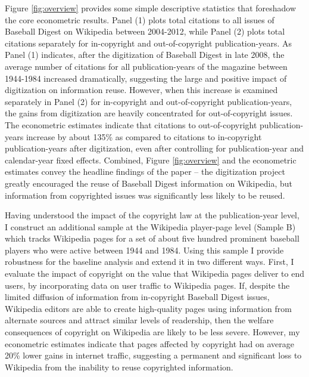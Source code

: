 \documentclass[11pt]{article}
\begin{document}
Figure \ref{fig:overview} provides some simple descriptive statistics that foreshadow the core econometric results. Panel (1) plots total citations to all issues of Baseball Digest on Wikipedia between 2004-2012, while Panel (2) plots total citations separately for in-copyright and out-of-copyright publication-years. As Panel (1) indicates, after the digitization of Baseball Digest in late 2008, the average number of citations for all publication-years of the magazine between 1944-1984 increased dramatically, suggesting the large and positive impact of digitization on information reuse. However, when this increase is examined separately in Panel (2) for in-copyright and out-of-copyright publication-years, the gains from digitization are heavily concentrated for out-of-copyright issues. The econometric estimates indicate that citations to out-of-copyright publication-years increase by about 135\% as compared to citations to in-copyright publication-years after digitization, even after controlling for publication-year and calendar-year fixed effects. Combined, Figure \ref{fig:overview} and the econometric estimates convey the headline findings of the paper -- the digitization project greatly encouraged the reuse of Baseball Digest information on Wikipedia, but information from copyrighted issues was significantly less likely to be reused. 

Having understood the impact of the copyright law at the publication-year level, I construct an additional sample at the Wikipedia player-page level (Sample B) which tracks Wikipedia pages for a set of about five hundred prominent baseball players who were active between 1944 and 1984. Using this sample I provide robustness for the baseline analysis and extend it in two different ways. First, I evaluate the impact of copyright on the value that Wikipedia pages deliver to end users, by incorporating data on user traffic to Wikipedia pages. If, despite the limited diffusion of information from in-copyright Baseball Digest issues, Wikipedia editors are able to create high-quality pages using information from alternate sources and attract similar levels of readership, then the welfare consequences of copyright on Wikipedia are likely to be less severe. However, my econometric estimates indicate that pages affected by copyright had on average 20\% lower gains in internet traffic, suggesting a permanent and significant loss to Wikipedia from the inability to reuse copyrighted information. 
\end{document}
